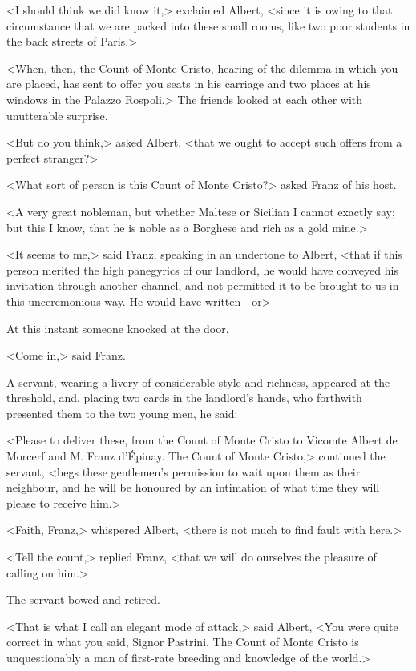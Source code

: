  <I should think we did know it,> exclaimed Albert, <since it is owing to that circumstance that we are packed into these small rooms, like two poor students in the back streets of Paris.> 

 <When, then, the Count of Monte Cristo, hearing of the dilemma in which you are placed, has sent to offer you seats in his carriage and two places at his windows in the Palazzo Rospoli.> The friends looked at each other with unutterable surprise. 

 <But do you think,> asked Albert, <that we ought to accept such offers from a perfect stranger?> 

 <What sort of person is this Count of Monte Cristo?> asked Franz of his host. 

 <A very great nobleman, but whether Maltese or Sicilian I cannot exactly say; but this I know, that he is noble as a Borghese and rich as a gold mine.> 

 <It seems to me,> said Franz, speaking in an undertone to Albert, <that if this person merited the high panegyrics of our landlord, he would have conveyed his invitation through another channel, and not permitted it to be brought to us in this unceremonious way. He would have written—or\longdash> 

 At this instant someone knocked at the door. 

 <Come in,> said Franz. 

 A servant, wearing a livery of considerable style and richness, appeared at the threshold, and, placing two cards in the landlord's hands, who forthwith presented them to the two young men, he said: 

 <Please to deliver these, from the Count of Monte Cristo to Vicomte Albert de Morcerf and M. Franz d'Épinay. The Count of Monte Cristo,> continued the servant, <begs these gentlemen's permission to wait upon them as their neighbour, and he will be honoured by an intimation of what time they will please to receive him.> 

 <Faith, Franz,> whispered Albert, <there is not much to find fault with here.> 

 <Tell the count,> replied Franz, <that we will do ourselves the pleasure of calling on him.> 

 The servant bowed and retired. 

 <That is what I call an elegant mode of attack,> said Albert, <You were quite correct in what you said, Signor Pastrini. The Count of Monte Cristo is unquestionably a man of first-rate breeding and knowledge of the world.> 

